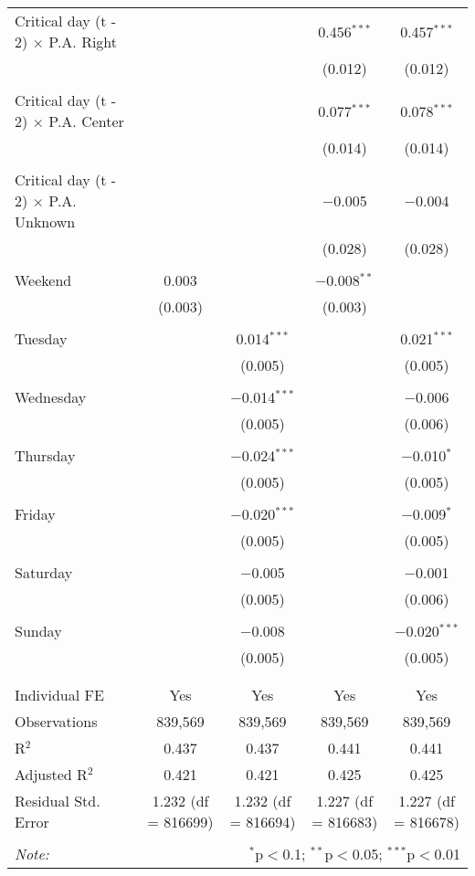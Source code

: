\documentclass[
]{article}
\begin{document}
\begin{table}[!htbp]
{\begin{tabular}{@{\extracolsep{5pt}}lcccc}
 Critical day (t - 2) $\times$ P.A. Right &  &  & 0.456$^{***}$ & 0.457$^{***}$ \\ 
  &  &  & (0.012) & (0.012) \\ 
  & & & & \\ 
 Critical day (t - 2) $\times$ P.A. Center &  &  & 0.077$^{***}$ & 0.078$^{***}$ \\ 
  &  &  & (0.014) & (0.014) \\ 
  & & & & \\ 
 Critical day (t - 2) $\times$ P.A. Unknown &  &  & $-$0.005 & $-$0.004 \\ 
  &  &  & (0.028) & (0.028) \\ 
  & & & & \\ 
 Weekend & 0.003 &  & $-$0.008$^{**}$ &  \\ 
  & (0.003) &  & (0.003) &  \\ 
  & & & & \\ 
 Tuesday &  & 0.014$^{***}$ &  & 0.021$^{***}$ \\ 
  &  & (0.005) &  & (0.005) \\ 
  & & & & \\ 
 Wednesday &  & $-$0.014$^{***}$ &  & $-$0.006 \\ 
  &  & (0.005) &  & (0.006) \\ 
  & & & & \\ 
 Thursday &  & $-$0.024$^{***}$ &  & $-$0.010$^{*}$ \\ 
  &  & (0.005) &  & (0.005) \\ 
  & & & & \\ 
 Friday &  & $-$0.020$^{***}$ &  & $-$0.009$^{*}$ \\ 
  &  & (0.005) &  & (0.005) \\ 
  & & & & \\ 
 Saturday &  & $-$0.005 &  & $-$0.001 \\ 
  &  & (0.005) &  & (0.006) \\ 
  & & & & \\ 
 Sunday &  & $-$0.008 &  & $-$0.020$^{***}$ \\ 
  &  & (0.005) &  & (0.005) \\ 
  & & & & \\ 
\hline \\[-1.8ex] 
Individual FE & Yes & Yes & Yes & Yes \\ 
Observations & 839,569 & 839,569 & 839,569 & 839,569 \\ 
R$^{2}$ & 0.437 & 0.437 & 0.441 & 0.441 \\ 
Adjusted R$^{2}$ & 0.421 & 0.421 & 0.425 & 0.425 \\ 
Residual Std. Error & 1.232 (df = 816699) & 1.232 (df = 816694) & 1.227 (df = 816683) & 1.227 (df = 816678) \\ 
\hline 
\hline \\[-1.8ex] 
\textit{Note:}  & \multicolumn{4}{r}{$^{*}$p$<$0.1; $^{**}$p$<$0.05; $^{***}$p$<$0.01} \\ 
\end{tabular}
} 
\end{table} 
\newpage
\end{document}
